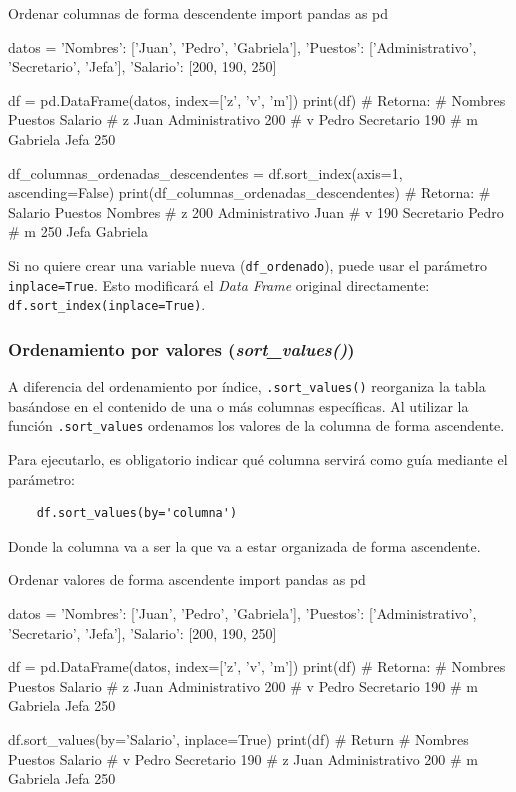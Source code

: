 \begin{pycode}{Ordenar columnas de forma descendente}
import pandas as pd

datos = {
    'Nombres': ['Juan', 'Pedro', 'Gabriela'],
    'Puestos': ['Administrativo', 'Secretario', 'Jefa'],
    'Salario': [200, 190, 250]
}

df = pd.DataFrame(datos, index=['z', 'v', 'm']) 
print(df) # Retorna:
#     Nombres         Puestos  Salario
# z      Juan  Administrativo      200
# v     Pedro      Secretario      190
# m  Gabriela            Jefa      250

df_columnas_ordenadas_descendentes = df.sort_index(axis=1, ascending=False)
print(df_columnas_ordenadas_descendentes) # Retorna: 
#    Salario         Puestos   Nombres
# z      200  Administrativo      Juan
# v      190      Secretario     Pedro
# m      250            Jefa  Gabriela
\end{pycode}

\begin{nota}
    Si no quiere crear una variable nueva (\texttt{df\_ordenado}), puede usar el parámetro \texttt{inplace=True}. Esto modificará el \textit{Data Frame} original directamente: \texttt{df.sort\_index(inplace=True)}.
\end{nota}


\subsubsection{Ordenamiento por valores (\textit{sort\_values()})}

A diferencia del ordenamiento por índice, \texttt{.sort\_values()} reorganiza la tabla basándose en el contenido de una o más columnas específicas. Al utilizar la función \texttt{.sort\_values} ordenamos los valores de la columna de forma ascendente.

Para ejecutarlo, es obligatorio indicar qué columna servirá como guía mediante el parámetro:
\begin{verbatim}
    df.sort_values(by='columna')
\end{verbatim}

Donde la columna va a ser la que va a estar organizada de forma ascendente.

\begin{pycode}{Ordenar valores de forma ascendente}
import pandas as pd

datos = {
    'Nombres': ['Juan', 'Pedro', 'Gabriela'],
    'Puestos': ['Administrativo', 'Secretario', 'Jefa'],
    'Salario': [200, 190, 250]
}

df = pd.DataFrame(datos, index=['z', 'v', 'm']) 
print(df) # Retorna:
#     Nombres         Puestos  Salario
# z      Juan  Administrativo      200
# v     Pedro      Secretario      190
# m  Gabriela            Jefa      250

df.sort_values(by='Salario', inplace=True)
print(df) # Return 
#     Nombres         Puestos  Salario
# v     Pedro      Secretario      190
# z      Juan  Administrativo      200
# m  Gabriela            Jefa      250
\end{pycode}

